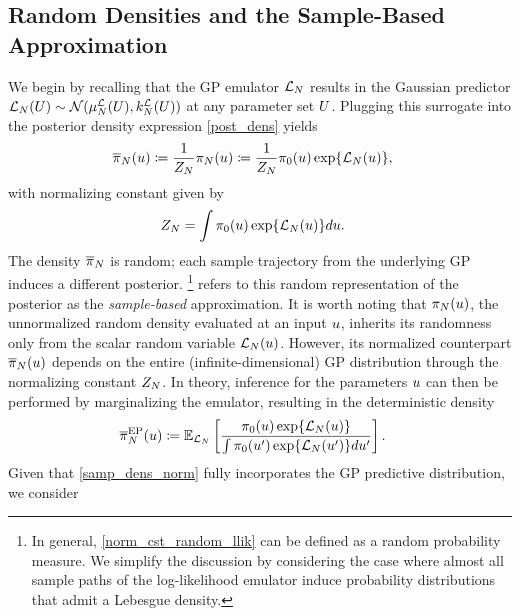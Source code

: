 \documentclass[12pt]{article}
\begin{document}
\subsection{Random Densities and the Sample-Based Approximation}
We begin by recalling that the GP emulator $\llikEm$ results in the Gaussian predictor 
 $\llikEm[\Ndesign](\parMat) \sim \Gaussian(\emMean[\Ndesign]{\llik}(\parMat), \emKer[\Ndesign]{\llik}(\parMat))$
 at any parameter set $\parMat$. Plugging this surrogate into the posterior density expression \ref{post_dens} yields
\begin{align}
\llikEmRdm[\Ndesign]{\postDensNorm}(\Par) 
&\Def \frac{1}{\llikEmRdm[\Ndesign]{\normCst}} \llikEmRdmDens[\Ndesign](\Par) 
\Def \frac{1}{\llikEmRdm[\Ndesign]{\normCst}} \priorDens(\Par) \Exp{\llikEm[\Ndesign](\Par)} \label{post_dens_random_llik},
\end{align}
with normalizing constant given by 
\begin{align}
\llikEmRdm[\Ndesign]{\normCst}
&= \int \priorDens(\Par) \Exp{\llikEm[\Ndesign](\Par)} d\Par \label{norm_cst_random_llik}. 
\end{align}
The density $\llikEmRdm[\Ndesign]{\postDensNorm}$ is random; each sample trajectory from the 
underlying GP induces a different posterior.
\footnote{In general, \ref{norm_cst_random_llik} can be defined as a random probability measure. We simplify the 
discussion by considering the case where almost all sample paths of the log-likelihood emulator induce probability 
distributions that admit a Lebesgue density.}
\citet{StuartTeck1} refers to this random representation of the posterior as the \textit{sample-based} approximation. 
It is worth noting that $\llikEmRdmDens[\Ndesign](\Par)$,
the unnormalized random density evaluated at an input $\Par$, inherits its randomness only from the scalar random 
variable $\llikEm(\Par)$. However, its normalized counterpart $\llikEmRdm[\Ndesign]{\postDensNorm}(\Par)$ depends 
on the entire (infinite-dimensional) GP distribution through the normalizing constant $\llikEmRdm[\Ndesign]{\normCst}$.
In theory, inference for the parameters $\Par$ can then be performed by marginalizing the emulator, resulting in the 
deterministic density
\begin{align}
\llikEmSampDensNorm[\Ndesign](\Par)
&\Def \E_{\llikEm}\left[\frac{\priorDens(\Par) \Exp{\llikEm[\Ndesign](\Par)}}{\int \priorDens(\Par^\prime) \Exp{\llikEm[\Ndesign](\Par^\prime)} d\Par^\prime} \right].
\label{samp_dens_norm}
\end{align}
Given that \ref{samp_dens_norm} fully incorporates the GP predictive distribution, we consider 
\end{document}
